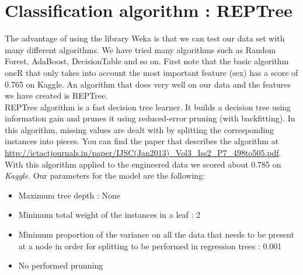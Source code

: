 \documentclass[11pt,a4paper,portrait]{article}
\begin{document}
\section{Classification algorithm : REPTree}
The advantage of using the library Weka is that we can test our data set with many different algorithms. We have tried many algorithms such as Random Forest, AdaBoost, DecisionTable and so on. First note that the basic algorithm oneR that only takes into account the most important feature (sex) has a score of 0.765 on Kaggle.  An algorithm that does very well on our data and the features we have created is REPTree.\\
REPTree algorithm is a fast decision tree learner. It builds a decision tree using information gain and prunes it using reduced-error pruning (with backfitting). In this algorithm, missing values are dealt with by splitting the corresponding instances into pieces. You can find the paper that describes the algorithm at \url{http://ictactjournals.in/paper/IJSC(Jan2013)_Vol3_Iss2_P7_498to505.pdf}.\\
With this algorithm applied to the engineered data we scored about 0.785 on \textit{Kaggle}. Our parameters for the model are the following:
\begin{itemize}
	\item Maximum tree depth : None
	\item Minimum total weight of the instances in a leaf : 2
	\item Minimum proportion of the variance on all the data that needs to be present at a node in order for splitting to be performed in regression trees : 0.001
	\item No performed prunning
\end{itemize}
\end{document}
